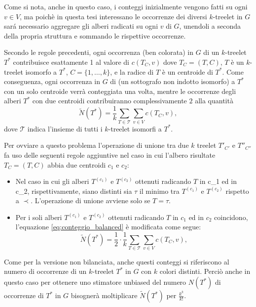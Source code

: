 Come si nota, anche in questo caso, i conteggi inizialmente vengono fatti su ogni $ v \in V $, ma poich\`e in questa tesi interessano le occorrenze dei diversi $ k $-treelet in $ G $  sar\'a necessario aggregare gli alberi radicati su ogni $ v $ di $ G $, unendoli a seconda della propria struttura e sommando le rispettive occorrenze.

Secondo le regole precedenti, ogni occorrenza (ben colorata) in $G$ di un $k$-treelet $T^*$ contribuisce esattamente 1 al valore di $c(T_C, v)$ dove $T_C = (T,C)$, $T$ è un $k$-treelet isomorfo a $T^*$, $C = \{1, \dots, k\}$, e la radice di $T$ è un centroide di $T^*$.
Come conseguenza, ogni occorrenza in $G$ di (un sottografo non indotto isomorfo) a $T^*$ con un solo centroide verrà conteggiata una volta, mentre le occorrenze degli alberi $T^*$ con due centroidi contribuiranno complessivamente $2$ alla quantità 
\begin{equation}
\label{eq:conteggio_balanced}
\widetilde{N}(T^*) = \frac{1}{k}\sum_{T \in \mathcal{T}} \sum_{v \in V} c( T_C, v),
\end{equation}
dove $\mathcal{T}$ indica l'insieme di tutti i $k$-treelet isomorfi a $T^*$.


Per ovviare a questo problema l'operazione di unione tra due $k$ treelet $T'_{C'}$ e $T''_{C''}$ fa uso delle seguenti regole aggiuntive nel caso in cui l'albero risultate $T_C = (T, C)$ abbia due centroidi $c_1$ e $c_2$:
\begin{itemize}
\item  Nel caso in cui gli alberi $T^{(c_1)}$ e $T^{(c_2)}$ ottenuti radicando $ T $
in c_1 ed in c_2, rispettivamente,  siano distinti sia $\tau$ il minimo tra $T^{(c_1)}$ e $T^{(c_2)}$ rispetto a $\prec$. L'operazione di unione avviene solo se $T = \tau$.

\item Per i soli alberi $T^{(c_1)}$ e $T^{(c_2)}$ ottenuti radicando $ T $
in $c_1$ ed in $c_2$ coincidono, l'equazione \eqref{eq:conteggio_balanced} è modificata come segue:
\[
\widetilde{N}(T^*) = \frac{1}{2} \cdot \frac{1}{k}\sum_{T \in \mathcal{T}} \sum_{v \in V} c( T_C, v),
\]
\end{itemize}


Come per la versione non bilanciata, anche questi conteggi si riferiscono al numero di occorrenze di un $ k $-treelet $ T^* $ in $ G $  con $ k $ colori distinti.
Perciò anche in questo caso per ottenere uno stimatore unbiased del numero $N(T^*)$ di occorrenze di $T^*$ in $G$ bisognerà moltiplicare $\widetilde{N}(T^*)$ per $ \frac{k^k}{k!} $.


